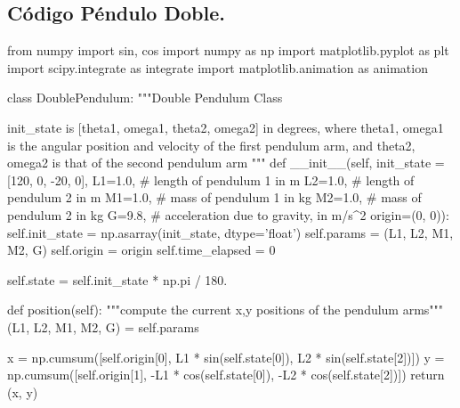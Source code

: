 \documentclass[12pt]{article}
\begin{document}
\subsection*{\textcolor{RubineRed}{Código Péndulo Doble.}}
\begin{center}
\begin{boxedverbatim}
from numpy import sin, cos
import numpy as np
import matplotlib.pyplot as plt
import scipy.integrate as integrate
import matplotlib.animation as animation

class DoublePendulum:
    """Double Pendulum Class

    init_state is [theta1, omega1, theta2, omega2] in degrees,
    where theta1, omega1 is the angular position and velocity of the first
    pendulum arm, and theta2, omega2 is that of the second pendulum arm
    """
    def __init__(self,
                 init_state = [120, 0, -20, 0],
                 L1=1.0,  # length of pendulum 1 in m
                 L2=1.0,  # length of pendulum 2 in m
                 M1=1.0,  # mass of pendulum 1 in kg
                 M2=1.0,  # mass of pendulum 2 in kg
                 G=9.8,  # acceleration due to gravity, in m/s^2
                 origin=(0, 0)): 
        self.init_state = np.asarray(init_state, dtype='float')
        self.params = (L1, L2, M1, M2, G)
        self.origin = origin
        self.time_elapsed = 0

        self.state = self.init_state * np.pi / 180.
    
    def position(self):
        """compute the current x,y positions of the pendulum arms"""
        (L1, L2, M1, M2, G) = self.params

        x = np.cumsum([self.origin[0],
              L1 * sin(self.state[0]),
              L2 * sin(self.state[2])])
        y = np.cumsum([self.origin[1],
              -L1 * cos(self.state[0]),
              -L2 * cos(self.state[2])])
         return (x, y)
\end{boxedverbatim}
\end{center}
\end{document}
